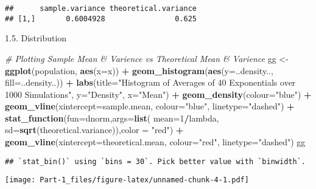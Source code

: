 \documentclass[
]{article}
\newenvironment{Shaded}{\begin{snugshade}}{\end{snugshade}}
\newcommand{\CommentTok}[1]{\textcolor[rgb]{0.56,0.35,0.01}{\textit{#1}}}
\newcommand{\DataTypeTok}[1]{\textcolor[rgb]{0.13,0.29,0.53}{#1}}
\newcommand{\DecValTok}[1]{\textcolor[rgb]{0.00,0.00,0.81}{#1}}
\newcommand{\KeywordTok}[1]{\textcolor[rgb]{0.13,0.29,0.53}{\textbf{#1}}}
\newcommand{\NormalTok}[1]{#1}
\newcommand{\OperatorTok}[1]{\textcolor[rgb]{0.81,0.36,0.00}{\textbf{#1}}}
\newcommand{\StringTok}[1]{\textcolor[rgb]{0.31,0.60,0.02}{#1}}
\begin{document}
\begin{verbatim}
##      sample.variance theoretical.variance
## [1,]       0.6004928                0.625
\end{verbatim}

1.5. Distribution

\begin{Shaded}
\begin{Highlighting}[]
\CommentTok{# Plotting Sample Mean & Varience vs Theoretical Mean & Varience}
\NormalTok{gg <-}\StringTok{ }\KeywordTok{ggplot}\NormalTok{(population, }\KeywordTok{aes}\NormalTok{(}\DataTypeTok{x=}\NormalTok{x)) }\OperatorTok{+}
\StringTok{  }\KeywordTok{geom_histogram}\NormalTok{(}\KeywordTok{aes}\NormalTok{(}\DataTypeTok{y=}\NormalTok{..density.., }\DataTypeTok{fill=}\NormalTok{..density..)) }\OperatorTok{+}
\StringTok{  }\KeywordTok{labs}\NormalTok{(}\DataTypeTok{title=}\StringTok{"Histogram of Averages of 40 Exponentials over 1000 Simulations"}\NormalTok{, }\DataTypeTok{y=}\StringTok{"Density"}\NormalTok{, }\DataTypeTok{x=}\StringTok{"Mean"}\NormalTok{) }\OperatorTok{+}\StringTok{ }
\StringTok{  }\KeywordTok{geom_density}\NormalTok{(}\DataTypeTok{colour=}\StringTok{"blue"}\NormalTok{) }\OperatorTok{+}
\StringTok{  }\KeywordTok{geom_vline}\NormalTok{(}\DataTypeTok{xintercept=}\NormalTok{sample.mean, }\DataTypeTok{colour=}\StringTok{"blue"}\NormalTok{, }\DataTypeTok{linetype=}\StringTok{"dashed"}\NormalTok{) }\OperatorTok{+}
\StringTok{  }\KeywordTok{stat_function}\NormalTok{(}\DataTypeTok{fun=}\NormalTok{dnorm,}\DataTypeTok{args=}\KeywordTok{list}\NormalTok{( }\DataTypeTok{mean=}\DecValTok{1}\OperatorTok{/}\NormalTok{lambda, }\DataTypeTok{sd=}\KeywordTok{sqrt}\NormalTok{(theoretical.variance)),}\DataTypeTok{color =} \StringTok{"red"}\NormalTok{) }\OperatorTok{+}
\StringTok{  }\KeywordTok{geom_vline}\NormalTok{(}\DataTypeTok{xintercept=}\NormalTok{theoretical.mean, }\DataTypeTok{colour=}\StringTok{"red"}\NormalTok{, }\DataTypeTok{linetype=}\StringTok{"dashed"}\NormalTok{) }
\NormalTok{gg}
\end{Highlighting}
\end{Shaded}

\begin{verbatim}
## `stat_bin()` using `bins = 30`. Pick better value with `binwidth`.
\end{verbatim}

\texttt{[image: Part-1\_files/figure-latex/unnamed-chunk-4-1.pdf]}
\end{document}
